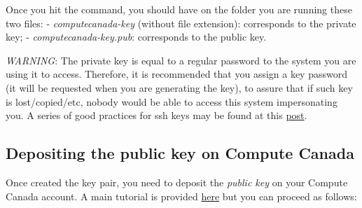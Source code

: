 \documentclass[
]{book}
\begin{document}
Once you hit the command, you should have on the folder you are running these two files:
- \emph{computecanada-key} (without file extension): corresponds to the private key;
- \emph{computecanada-key.pub}: corresponds to the public key.

\emph{WARNING}: The private key is equal to a regular password to the system you are using it to access. Therefore, it is recommended that you assign a key password
(it will be requested when you are generating the key), to assure that if such key is lost/copied/etc, nobody would be able to access this system impersonating you. A series of good practices for ssh keys may be found at this \href{https://security.stackexchange.com/a/144044/275095}{post}.

\hypertarget{depositing-the-public-key-on-compute-canada}{%
\subsection{Depositing the public key on Compute Canada}\label{depositing-the-public-key-on-compute-canada}}

Once created the key pair, you need to deposit the \emph{public key} on your Compute
Canada account. A main tutorial is provided \href{https://docs.computecanada.ca/wiki/SSH_Keys}{here}
but you can proceed as follows:
\end{document}
